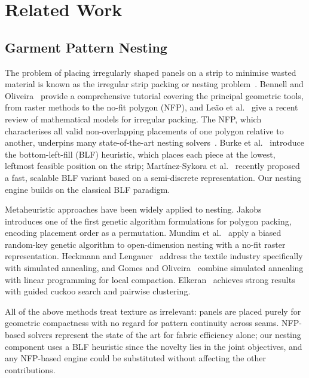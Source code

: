 \section{Related Work}
\label{sec:related_work}

\subsection{Garment Pattern Nesting}
\label{sec:rw_nesting}

The problem of placing irregularly shaped panels on a strip to minimise
wasted material is known as the irregular strip packing or nesting
problem~\cite{WascherHS07}.
Bennell and Oliveira~\cite{BennellO08} provide a comprehensive tutorial
covering the principal geometric tools, from raster methods to the
no-fit polygon (NFP), and Le{\~a}o et al.~\cite{LeaoTOCA20} give a recent
review of mathematical models for irregular packing.
The NFP, which characterises all valid non-overlapping placements of one
polygon relative to another, underpins many state-of-the-art nesting
solvers~\cite{BurkeHKW07}.
Burke et al.~\cite{BurkeHKW06} introduce the bottom-left-fill (BLF)
heuristic, which places each piece at the lowest, leftmost feasible position
on the strip; Mart{\'i}nez-Sykora et al.~\cite{MartinezSykoraACRO22}
recently proposed a fast, scalable BLF variant based on a semi-discrete
representation.
Our nesting engine builds on the classical BLF paradigm.

Metaheuristic approaches have been widely applied to nesting.
Jakobs~\cite{Jakobs96} introduces one of the first genetic algorithm
formulations for polygon packing, encoding placement order as a permutation.
Mundim et al.~\cite{MundimAQO17} apply a biased random-key genetic
algorithm to open-dimension nesting with a no-fit raster representation.
Heckmann and Lengauer~\cite{HeckmannL95} address the textile industry
specifically with simulated annealing, and
Gomes and Oliveira~\cite{GomesO06} combine simulated annealing with linear
programming for local compaction.
Elkeran~\cite{Elkeran13} achieves strong results with guided cuckoo search
and pairwise clustering.

All of the above methods treat texture as irrelevant: panels are placed
purely for geometric compactness with no regard for pattern continuity
across seams.
NFP-based solvers represent the state of the art for fabric efficiency
alone; our nesting component uses a BLF heuristic since the novelty lies
in the joint objectives, and any NFP-based engine could be substituted
without affecting the other contributions.

